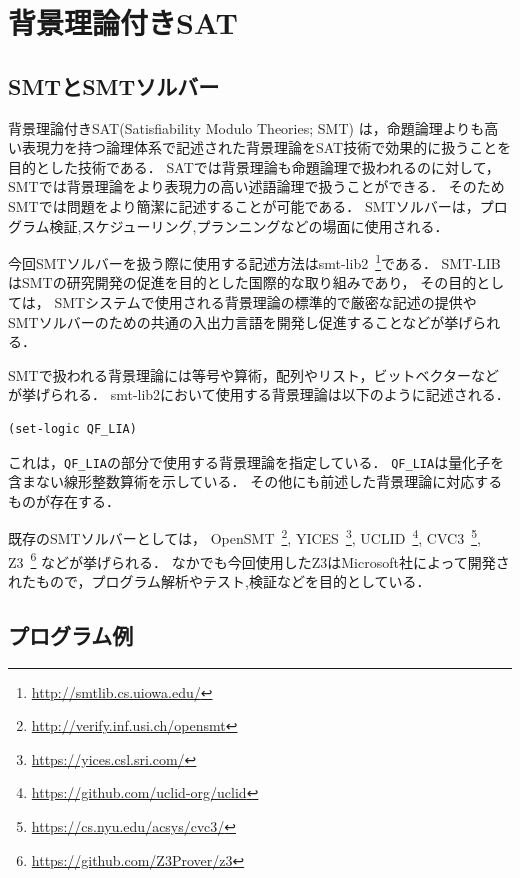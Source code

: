 
\chapter{背景理論付きSAT}\label{chap:smt}

%
%
\section{SMTとSMTソルバー}
背景理論付きSAT(Satisfiability Modulo Theories; SMT)\cite{JSAI:IwanumaN10, Umemura10:jssst, weko_169448_1}
は，命題論理よりも高い表現力を持つ論理体系で記述された背景理論をSAT技術で効果的に扱うことを目的とした技術である．
SATでは背景理論も命題論理で扱われるのに対して，SMTでは背景理論をより表現力の高い述語論理で扱うことができる．
そのためSMTでは問題をより簡潔に記述することが可能である．
SMTソルバーは，プログラム検証,スケジューリング,プランニングなどの場面に使用される．

今回SMTソルバーを扱う際に使用する記述方法はsmt-lib2~\footnote{\url{http://smtlib.cs.uiowa.edu/}}である．
SMT-LIBはSMTの研究開発の促進を目的とした国際的な取り組みであり，
その目的としては，
SMTシステムで使用される背景理論の標準的で厳密な記述の提供や
SMTソルバーのための共通の入出力言語を開発し促進することなどが挙げられる．

SMTで扱われる背景理論には等号や算術，配列やリスト，ビットベクターなどが挙げられる．
smt-lib2において使用する背景理論は以下のように記述される．
{\footnotesize \begin{verbatim}
(set-logic QF_LIA)
\end{verbatim}}
これは，\verb|QF_LIA|の部分で使用する背景理論を指定している．
\verb|QF_LIA|は量化子を含まない線形整数算術を示している．
その他にも前述した背景理論に対応するものが存在する．

既存のSMTソルバーとしては，
OpenSMT~\footnote{\url{http://verify.inf.usi.ch/opensmt}},
YICES~\footnote{\url{https://yices.csl.sri.com/}},
UCLID~\footnote{\url{https://github.com/uclid-org/uclid}},
CVC3~\footnote{\url{https://cs.nyu.edu/acsys/cvc3/}},
Z3~\footnote{\url{https://github.com/Z3Prover/z3}}
などが挙げられる．
なかでも今回使用したZ3はMicrosoft社によって開発されたもので，プログラム解析やテスト,検証などを目的としている．


\section{プログラム例}


